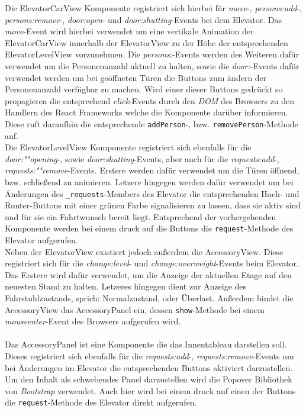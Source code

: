Die ElevatorCarView Komponente registriert sich hierbei für \textit{move}-, \textit{persons:add}-, \textit{persons:remove}-, \textit{door:open}- und \textit{door:shutting}-Events bei dem Elevator.
Das \textit{move}-Event wird hierbei verwendet um eine vertikale Animation der ElevatorCarView innerhalb der ElevatorView zu der Höhe der entsprechenden ElevatorLevelView vorzunehmen.
Die \textit{persons:}-Events werden des Weiteren dafür verwendet um die Personenanzahl aktuell zu halten, sowie die \textit{door:}-Events dafür verwendet werden um bei geöffneten Türen die Buttons zum ändern der Personenanzahl verfügbar zu machen.
Wird einer dieser Buttons gedrückt so propagieren die entsprechend \textit{click}-Events durch den \textit{DOM} des Browsers zu den Handlern des React Frameworks welche die Komponente darüber informieren.
Diese ruft daraufhin die entsprechende \texttt{addPerson}-, bzw. \texttt{removePerson}-Methode auf. \\

\newpage
Die ElevatorLevelView Komponente registriert sich ebenfalls für die \textit{door:""opening}-, sowie \textit{door:shutting}-Events, aber auch für die \textit{requests:add}-, \textit{requests:""remove}-Events.
Erstere werden dafür verwendet um die Türen öffnend, bzw. schließend zu animieren.
Letzere hingegen werden dafür verwendet um bei Änderungen des \texttt{\_requests}-Members des Elevator die entsprechenden Hoch- und Runter-Buttons mit einer grünen Farbe signalisieren zu lassen, dass sie aktiv sind und für sie ein Fahrtwunsch bereit liegt.
Entsprechend der vorhergehenden Komponente werden bei einem druck auf die Buttons die \texttt{request}-Methode des Elevator aufgerufen. \\

Neben der ElevatorView existiert jedoch außerdem die AccessoryView.
Diese registriert sich für die \textit{change:level}- und \textit{change:overweight}-Events beim Elevator.
Das Erstere wird dafür verwendet, um die Anzeige der aktuellen Etage auf den neuesten Stand zu halten.
Letzeres hingegen dient zur Anzeige des Fahrstuhlzustands, sprich: Normalzustand, oder Überlast.
Außerdem bindet die AccessoryView das AccessoryPanel ein, dessen \texttt{show}-Methode bei einem \textit{mouseenter}-Event des Browsers aufgerufen wird.

\paragraph{}
Das AccessoryPanel ist eine Komponente die das Innentableau darstellen soll.
Dieses registriert sich ebenfalls für die \textit{requests:add}-, \textit{requests:remove}-Events um bei Änderungen im Elevator die entsprechenden Buttons aktiviert darzustellen.
Um den Inhalt als schwebendes Panel darzustellen wird die Popover Bibliothek von \textit{Bootstrap} verwendet.
Auch hier wird bei einem druck auf einen der Buttons die \texttt{request}-Methode des Elevator direkt aufgerufen.


